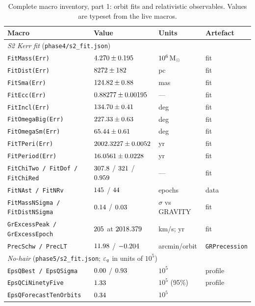 \begin{table}[p]
\centering
\caption{Complete macro inventory, part 1: orbit fits and relativistic
observables. Values are typeset from the live macros.}
\label{tab:macros1}
\footnotesize
\setlength{\tabcolsep}{4pt}
\begin{tabular}{llll}
\toprule
Macro & Value & Units & Artefact \\
\midrule
\multicolumn{4}{l}{\emph{S2 Kerr fit} (\texttt{phase4/s2\_fit.json})}\\
\texttt{FitMass(Err)} & $4.270\pm0.195$ & $10^6\,\mathrm{M}_\odot$ & fit \\
\texttt{FitDist(Err)} & $8272\pm182$ & pc & fit \\
\texttt{FitSma(Err)} & $124.82\pm0.88$ & mas & fit \\
\texttt{FitEcc(Err)} & $0.88277\pm0.00195$ & --- & fit \\
\texttt{FitIncl(Err)} & $134.70\pm0.41$ & deg & fit \\
\texttt{FitOmegaBig(Err)} & $227.33\pm0.63$ & deg & fit \\
\texttt{FitOmegaSm(Err)} & $65.44\pm0.61$ & deg & fit \\
\texttt{FitTPeri(Err)} & $2002.3227\pm0.0052$ & yr & fit \\
\texttt{FitPeriod(Err)} & $16.0561\pm0.0228$ & yr & fit \\
\texttt{FitChiTwo / FitDof / FitChiRed} &
  $307.8$ / $321$ / $0.959$ & --- & fit \\
\texttt{FitNAst / FitNRv} & $145$ / $44$ & epochs & data \\
\texttt{FitMassNSigma / FitDistNSigma} &
  $0.14$ / $0.03$ & $\sigma$ vs GRAVITY & fit \\
\texttt{GrExcessPeak / GrExcessEpoch} &
  $205$ at $2018.379$ & km/s; yr & fit \\
\texttt{PrecSchw / PrecLT} & $11.98$ / $-0.204$ & arcmin/orbit &
  \texttt{GRPrecession} \\
\midrule
\multicolumn{4}{l}{\emph{No-hair} (\texttt{phase5/s2\_fit.json};
$\varepsilon_q$ in units of $10^{5}$)}\\
\texttt{EpsQBest / EpsQSigma} & $0.00$ / $0.93$ & $10^5$ &
  profile \\
\texttt{EpsQCiNinetyFive} & $1.33$ & $10^5$ (95\%) &
  profile \\
\texttt{EpsQForecastTenOrbits} & $0.34$ & $10^5$ &

\end{tabular}
\end{table}
